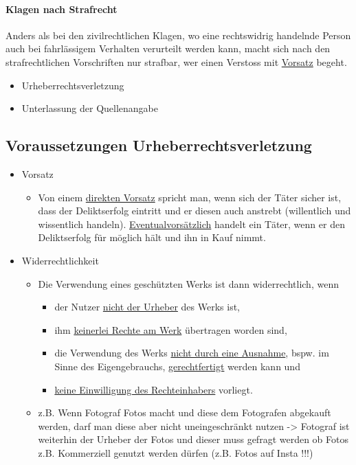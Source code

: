 \paragraph{Klagen nach Strafrecht}
Anders als bei den zivilrechtlichen Klagen, wo eine rechtswidrig handelnde Person auch bei fahrlässigem Verhalten verurteilt werden kann, macht sich nach den strafrechtlichen Vorschriften nur strafbar, wer einen Verstoss mit \underline{Vorsatz} begeht.

\begin{itemize}
    \item Urheberrechtsverletzung
    \item Unterlassung der Quellenangabe
\end{itemize}

\subsection{Voraussetzungen Urheberrechtsverletzung}
\begin{itemize}
    \item Vorsatz
    \begin{itemize}
        \item Von einem \underline{direkten Vorsatz} spricht man, wenn sich der Täter sicher ist, dass der Deliktserfolg eintritt und er diesen auch anstrebt (willentlich und wissentlich handeln). \underline{Eventualvorsätzlich} handelt ein Täter, wenn er den Deliktserfolg für möglich hält und ihn in Kauf nimmt.
    \end{itemize}
    \item Widerrechtlichkeit
    \begin{itemize}
        \item Die Verwendung eines geschützten Werks ist dann widerrechtlich, wenn
        \begin{itemize}
            \item der Nutzer \underline{nicht der Urheber} des Werks ist,
            \item ihm \underline{keinerlei Rechte am Werk} übertragen worden sind,
            \item die Verwendung des Werks \underline{nicht durch eine Ausnahme}, bspw. im Sinne des Eigengebrauchs, \underline{gerechtfertigt} werden kann und
            \item \underline{keine Einwilligung des Rechteinhabers} vorliegt.
        \end{itemize}
        \item z.B. Wenn Fotograf Fotos macht und diese dem Fotografen abgekauft werden, darf man diese aber nicht  uneingeschränkt nutzen -> Fotograf ist weiterhin der Urheber der Fotos und dieser muss gefragt werden ob Fotos z.B. Kommerziell genutzt werden dürfen (z.B. Fotos auf Insta !!!)
    \end{itemize}
\end{itemize}
